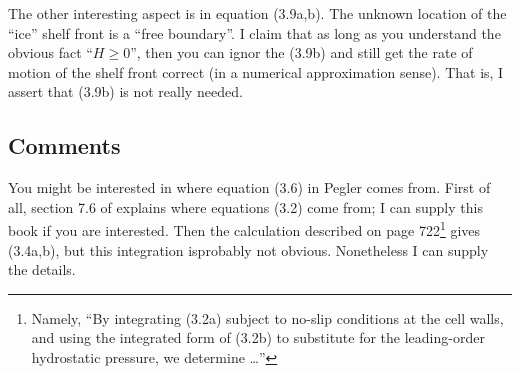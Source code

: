 \documentclass[11pt,final]{amsart}%
\begin{document}
The other interesting aspect is in equation (3.9a,b).  The unknown location of the ``ice'' shelf front is a ``free boundary''.  I claim that as long as you understand the obvious fact ``$H\ge 0$'', then you can ignor the (3.9b) and still get the rate of motion of the shelf front correct (in a numerical approximation sense).  That is, I assert that (3.9b) is not really needed.

\subsection*{Comments}  You might be interested in where equation (3.6) in Pegler comes from.  First of all, section 7.6 of \cite{Acheson} explains where equations (3.2) come from; I can supply this book if you are interested.  Then the calculation described on page 722\footnote{Namely, ``By integrating (3.2a) subject to no-slip conditions at the cell walls, and using the integrated form of (3.2b) to substitute for the leading-order hydrostatic pressure, we determine \dots''} gives (3.4a,b), but this integration isprobably not obvious.  Nonetheless I can supply the details.


\small

\end{document}
